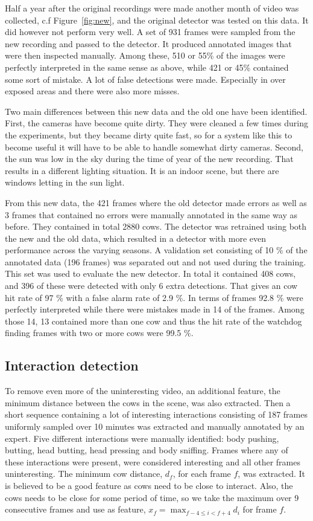\documentclass{cta-author}
\begin{document}
Half a year after the original recordings were made another month of video was collected, c.f Figure~\ref{fig:new}, and the original detector was tested on this data. It did however not perform very well. A set of 931 frames were sampled from the new recording and passed to the detector. It produced annotated images that were then inspected manually. Among these, 510 or 55\% of the images were perfectly interpreted in the same sense as above, while 421 or 45\% contained some sort of mistake.
A lot of false detections were made. Especially in over exposed areas and there were also more misses. 

Two main differences between this new data and the old one have been identified. 
First, the cameras have become quite dirty. They were cleaned a few times during the experiments, but they became dirty quite fast, so for a system like this to become useful it will have to be able to handle somewhat dirty cameras. Second, the sun was low in the sky during  the time of year of the new recording. That results in a different lighting situation. It is an indoor scene, but there are windows letting in the sun light.

From this new data, the 421 frames where the old detector made errors as well as 3 frames that contained no errors were manually annotated in the same way as before. They contained in total 2880 cows. The detector was retrained using both the new and the old data, which resulted in a detector with more even performance across the varying seasons. A validation set consisting of 10 \% of the annotated data (196 frames) was separated out and not used during the training. This set was used to evaluate the new detector. In total it contained 408 cows, and 396 of these were detected with only 6 extra detections. That gives an cow hit rate of 97 \% with a false alarm rate of 2.9 \%. In terms of frames 92.8 \% were perfectly interpreted while there were mistakes made in 14 of the frames. Among those 14, 13 contained more than one cow and thus the hit rate of the watchdog finding frames with two or more cows were 99.5 \%.

\subsection{Interaction detection}
To remove even more of the uninteresting video, an additional feature, the minimum distance between the cows in the scene, was also extracted. Then a short sequence containing a lot of interesting interactions consisting of 187 frames uniformly sampled over 10 minutes was extracted and manually annotated by an expert. Five different interactions were manually identified: body pushing, butting, head butting, head pressing and body sniffing. Frames where any of these interactions were present, were considered interesting and all other frames uninteresting. The minimum cow distance, $d_f$, for each frame $f$, was extracted. It is believed to be a good feature as cows need to be close to interact. Also, the cows needs to be close for some period of time, so we take the maximum over 9 consecutive frames and use as feature, 
$x_f = \max_{f-4 \leq i < f+4} d_i$ for frame $f$.
\end{document}
